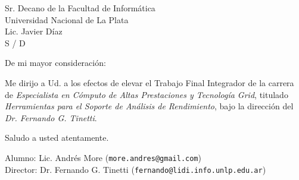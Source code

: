 \documentclass[a4paper]{letter}
\date{Córdoba, Agosto del 2013}
\begin{document}
\begin{letter}{Sr. Decano de la Facultad de Informática\\
Universidad Nacional de La Plata\\
Lic. Javier Díaz\\
S / D}

\opening{De mi mayor consideración:}

Me dirijo a Ud. a los efectos de elevar el Trabajo Final Integrador de la carrera de {\it Especialista en Cómputo de Altas Prestaciones y Tecnología Grid}, titulado {\it Herramientas para el Soporte de Análisis de Rendimiento}, bajo la dirección del {\it Dr. Fernando G. Tinetti}.

\closing{Saludo a usted atentamente.}

Alumno: Lic. Andrés More ({\tt more.andres@gmail.com})\\
Director: Dr. Fernando G. Tinetti ({\tt fernando@lidi.info.unlp.edu.ar})


\end{letter}
\end{document}
